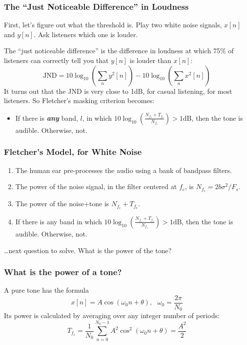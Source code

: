 \begin{frame}
  \frametitle{The ``Just Noticeable Difference'' in Loudness}

  First, let's figure out what the threshold is.  Play two white noise
  signals, $x[n]$ and $y[n]$.  Ask listeners which one is louder.

  The ``just noticeable difference'' is the difference in loudness at
  which 75\% of listeners can correctly tell you that $y[n]$ is louder than $x[n]$:
  \[
  \mbox{JND} = 10\log_{10}\left(\sum_n y^2[n]\right) - 10\log_{10}\left(\sum_n x^2[n]\right)
  \]
  It turns out that the JND is very close to 1dB, for casual
  listening, for most listeners.  So Fletcher's masking criterion becomes:
  \begin{itemize}
    \item If there is {\bf\em any} band, $l$, in which
      $10\log_{10}\left(\frac{N_{f_c}+T_{f_c}}{N_{f_c}}\right)>1\mbox{dB}$, then
      the tone is audible.  Otherwise, not.
  \end{itemize}
\end{frame}

\begin{frame}
  \frametitle{Fletcher's Model, for White Noise}

  \begin{enumerate}
  \item The human ear pre-processes  the audio using a bank of bandpass filters.
  \item The power of the noise signal, in the  filter centered at $f_c$, is $N_{f_c}=2b\sigma^2/F_s$.
  \item The power of the noise+tone is $N_{f_c}+T_{f_c}$.
  \item If there is any band in which
    $10\log_{10}\left(\frac{N_{f_c}+T_{f_c}}{N_{f_c}}\right)>1\mbox{dB}$, then
    the tone is audible.  Otherwise, not.
  \end{enumerate}
  \ldots next question to solve.  What is the power of the tone?
\end{frame}

\begin{frame}
  \frametitle{What is the power of a tone?}

  A pure tone has the formula
  \[
  x[n] = A\cos\left(\omega_0 n+\theta\right),~~~\omega_0=\frac{2\pi}{N_0}
  \]
  Its power is calculated by averaging over any integer number of
  periods:
  \[
  T_{f_c} = \frac{1}{N_0}\sum_{n=0}^{N_0-1} A^2\cos^2\left(\omega_0 n+\theta\right) = \frac{A^2}{2}
  \]
\end{frame}

